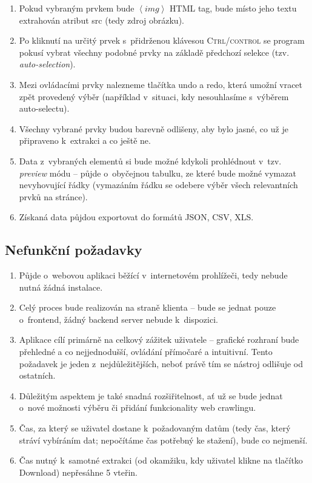 \documentclass[thesis=B,czech]{FITthesis}[2012/06/26]
\begin{document}
\begin{enumerate}[F1)]
\begin{enumerate}[F3.1)]
	\end{enumerate}
	\item Pokud vybraným prvkem bude $\left<img\right>$ HTML tag, bude místo jeho textu extrahován atribut \textsf{src} (tedy zdroj obrázku).
	\item Po kliknutí na určitý prvek s~přidrženou klávesou \textsc{Ctrl/control} se program pokusí vybrat všechny podobné prvky na základě předchozí selekce (tzv. \emph{auto-selection}).
	\item Mezi ovládacími prvky nalezneme tlačítka \textsf{undo} a \textsf{redo}, která umožní vracet zpět provedený výběr (například v~situaci, kdy nesouhlasíme s~výběrem auto-selectu).
	\item Všechny vybrané prvky budou barevně odlišeny, aby bylo jasné, co už je připraveno k~extrakci a co ještě ne.
	\item Data z~vybraných elementů si bude možné kdykoli prohlédnout v~tzv. \textit{preview} módu -- půjde o~obyčejnou tabulku, ze které bude možné vymazat nevyhovující řádky (vymazáním řádku se odebere výběr všech relevantních prvků na stránce).
	\item Získaná data půjdou exportovat do formátů JSON, CSV, XLS.
\end{enumerate}

\subsection{Nefunkční požadavky}
\begin{enumerate}[N1)]
	\item Půjde o~webovou aplikaci běžící v~internetovém prohlížeči, tedy nebude nutná žádná instalace.
	\item Celý proces bude realizován na straně klienta -- bude se jednat pouze o~frontend, žádný backend server nebude k~dispozici.
	\item Aplikace cílí primárně na celkový zážitek uživatele -- grafické rozhraní bude přehledné a co nejjednodušší, ovládání přímočaré a intuitivní. Tento požadavek je jeden z~nejdůležitějších, neboť právě tím se nástroj odlišuje od ostatních.
	\item Důležitým aspektem je také snadná rozšiřitelnost, ať už se bude jednat o~nové možnosti výběru či přidání funkcionality web crawlingu.
	\item Čas, za který se uživatel dostane k~požadovaným datům (tedy čas, který stráví vybíráním dat; nepočítáme čas potřebný ke stažení), bude co nejmenší.
	\item Čas nutný k~samotné extrakci (od okamžiku, kdy uživatel klikne na tlačítko \textsf{Download}) nepřesáhne 5 vteřin.
\end{enumerate}
\end{document}
